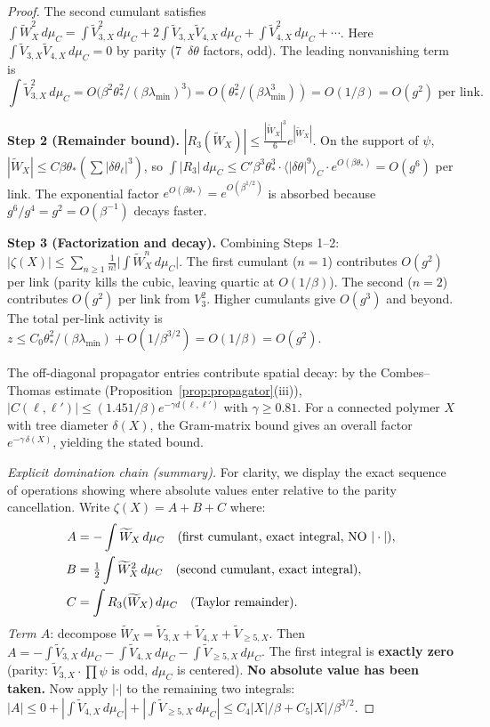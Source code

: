 \documentclass[11pt]{article}
\theoremstyle{definition}
\begin{document}
\begin{proof}
The second cumulant satisfies
$\int\widetilde{W}_X^2\,d\mu_C
=\int\widetilde{V}_{3,X}^2\,d\mu_C
+2\int\widetilde{V}_{3,X}\widetilde{V}_{4,X}\,d\mu_C
+\int\widetilde{V}_{4,X}^2\,d\mu_C+\cdots$.
Here $\int\widetilde{V}_{3,X}\widetilde{V}_{4,X}\,d\mu_C=0$ by parity
(7~$\delta\theta$ factors, odd).  The leading nonvanishing
term is
\begin{equation}
\int\widetilde{V}_{3,X}^2\,d\mu_C
=O\bigl(\beta^2\theta_*^2/(\beta\lambda_{\min})^3\bigr)
=O(\theta_*^2/(\beta\lambda_{\min}^3))=O(1/\beta)=O(g^2)\text{ per link}.
\end{equation}

\textbf{Step 2 (Remainder bound).}
$|R_3(\widetilde{W}_X)|\le\frac{|\widetilde{W}_X|^3}{6}
e^{|\widetilde{W}_X|}$.
On the support of $\psi$, $|\widetilde{W}_X|
\le C\beta\theta_*(\sum|\delta\theta_\ell|^3)$, so
$\int|R_3|\,d\mu_C\le C'\beta^3\theta_*^3\cdot
\langle|\delta\theta|^9\rangle_C\cdot e^{O(\beta\theta_*)}
=O(g^6)$ per link.  The exponential factor
$e^{O(\beta\theta_*)}=e^{O(\beta^{1/2})}$ is absorbed because
$g^6/g^4=g^2=O(\beta^{-1})$ decays faster.

\textbf{Step 3 (Factorization and decay).}
Combining Steps 1--2:
$|\zeta(X)|\le\sum_{n\ge 1}\frac{1}{n!}\bigl|\int\widetilde{W}_X^n
\,d\mu_C\bigr|$.
The first cumulant ($n=1$) contributes $O(g^2)$ per link (parity
kills the cubic, leaving quartic at $O(1/\beta)$).  The second ($n=2$) contributes
$O(g^2)$ per link from $V_3^2$.  Higher cumulants give $O(g^3)$
and beyond.  The total per-link activity is
$z\le C_0\theta_*^2/(\beta\lambda_{\min})+O(1/\beta^{3/2})
=O(1/\beta)=O(g^2)$.

The off-diagonal propagator entries contribute spatial decay:
by the Combes--Thomas estimate
(Proposition~\ref{prop:propagator}(iii)),
$|C(\ell,\ell')|\le(1.451/\beta)e^{-\gamma d(\ell,\ell')}$
with $\gamma\ge 0.81$.
For a connected polymer $X$ with tree diameter $\delta(X)$, the
Gram-matrix bound gives an overall factor $e^{-\gamma\,\delta(X)}$,
yielding the stated bound.

\emph{Explicit domination chain (summary).}
For clarity, we display the exact sequence of operations
showing where absolute values enter relative to the
parity cancellation.  Write $\zeta(X)=A+B+C$ where:
\begin{align}
A&=-\int\widetilde{W}_X\,d\mu_C
\quad\text{(first cumulant, exact integral, NO $|\cdot|$)},
\notag\\
B&=\tfrac{1}{2}\int\widetilde{W}_X^2\,d\mu_C
\quad\text{(second cumulant, exact integral)},
\notag\\
C&=\int R_3(\widetilde{W}_X)\,d\mu_C
\quad\text{(Taylor remainder)}.
\notag
\end{align}
\emph{Term $A$}: decompose $\widetilde{W}_X
=\widetilde{V}_{3,X}+\widetilde{V}_{4,X}
+\widetilde{V}_{\ge 5,X}$.
Then $A=-\int\widetilde{V}_{3,X}\,d\mu_C
-\int\widetilde{V}_{4,X}\,d\mu_C
-\int\widetilde{V}_{\ge 5,X}\,d\mu_C$.
The first integral is \textbf{exactly zero} (parity:
$\widetilde{V}_{3,X}\cdot\prod\psi$ is odd, $d\mu_C$ is centered).
\textbf{No absolute value has been taken.}
Now apply $|\cdot|$ to the remaining two integrals:
$|A|\le 0+|\int\widetilde{V}_{4,X}\,d\mu_C|
+|\int\widetilde{V}_{\ge 5,X}\,d\mu_C|
\le C_4|X|/\beta+C_5|X|/\beta^{3/2}$.


\end{proof}
\end{document}
